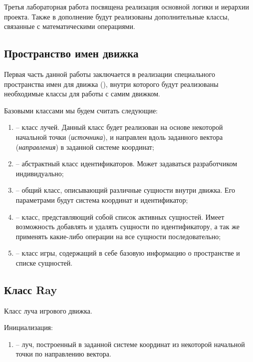 Третья лабораторная работа посвящена реализация основной логики и иерархии проекта. Также в дополнение будут реализованы дополнительные классы, связанные с математическими операциями. 


\subsection{Пространство имен движка}

	Первая часть данной работы заключается в реализации специального пространства имен для движка (), внутри которого будут реализованы необходимые классы для работы с самим движком. 

	Базовыми классами мы будем считать следующие:
	\begin{enumerate} 
		\item {} -- класс лучей. Данный класс будет реализован на основе некоторой начальной точки (\textit{источника}), и направлен вдоль заданного вектора (\textit{направления}) в заданной системе координат;
		\item {} -- абстрактный класс идентификаторов. Может задаваться разработчиком индивидуально;
		\item {} -- общий класс, описывающий различные сущности внутри движка. Его параметрами будут система координат и идентификатор;
		\item {} -- класс, представляющий собой список активных сущностей. Имеет возможность добавлять и удалять сущности по идентификатору, а так же применять какие-либо операции на все сущности последовательно;
		\item {} -- класс игры, содержащий в себе базовую информацию о пространстве и списке сущностей.
	\end{enumerate} 


\subsection{Класс Ray}
	\noindent Класс луча игрового движка.

	\noindent Инициализация:
	\begin{enumerate}
		\item {} -- луч, построенный в заданной системе координат из некоторой начальной точки по направлению вектора.
	\end{enumerate}

